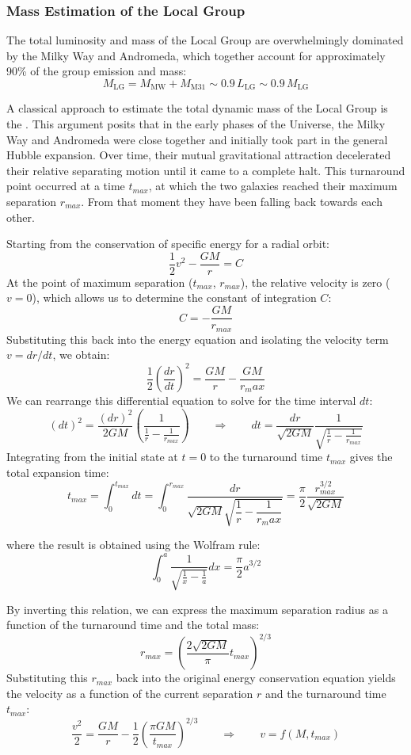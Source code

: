 \subsubsection{Mass Estimation of the Local Group}

The total luminosity and mass of the Local Group are overwhelmingly dominated by the Milky Way and Andromeda, which together account for approximately 90\% of the group emission and mass:
$$
M_{\mathrm{LG}} = M_{\mathrm{MW}} + M_{\mathrm{M31}} \sim 0.9\,L_{\mathrm{LG}} \sim 0.9\,M_{\mathrm{LG}}
$$

A classical approach to estimate the total dynamic mass of the Local Group is the . This argument posits that in the early phases of the Universe, the Milky Way and Andromeda were close together and initially took part in the general Hubble expansion. Over time, their mutual gravitational attraction decelerated their relative separating motion until it came to a complete halt. This turnaround point occurred at a time $t_{max}$, at which the two galaxies reached their maximum separation $r_{max}$. From that moment they have been falling back towards each other.

Starting from the conservation of specific energy for a radial orbit:
$$
\frac{1}{2} v^2 - \frac{G M}{r} = C
$$
At the point of maximum separation ($t_{max}$, $r_{max}$), the relative velocity is zero ($v = 0$), which allows us to determine the constant of integration $C$:
$$
C = - \frac{G M}{r_{max}}
$$
Substituting this back into the energy equation and isolating the velocity term $v = dr/dt$, we obtain:
$$
\dfrac 12 \left( \dfrac{dr}{dt} \right)^2 = \dfrac {G M}{r} - \dfrac{G M}{r_max}
$$
We can rearrange this differential equation to solve for the time interval $dt$:
$$
(dt)^2 = \frac{(dr)^2}{2 GM} \left( \frac{1}{\frac{1}{r} - \frac{1}{r_{max}}} \right) \qquad \Rightarrow \qquad dt = \frac{dr}{\sqrt{2 GM}} \frac{1}{\sqrt{\frac{1}{r} - \frac{1}{r_{max}}}}
$$
Integrating from the initial state at $t=0$ to the turnaround time $t_{max}$ gives the total expansion time:
$$
t_{max} = \int_0^{t_{max}} dt = \int_0^{r_{max}} \dfrac{dr}{\sqrt{2 GM} \sqrt{\dfrac{1}{r} - \dfrac{1}{r_max}}} = \dfrac {\pi}{2} \dfrac{r_{max}^{3/2}}{\sqrt{2 GM}}
$$

where the result is obtained using the Wolfram rule:
$$
\int_0^a \dfrac 1{\sqrt{\frac 1x - \frac 1a}} dx = \dfrac {\pi}{2} a^{3/2}
$$

By inverting this relation, we can express the maximum separation radius as a function of the turnaround time and the total mass:
$$
r_{max} = \left( \dfrac{2 \sqrt{2 G M}}{\pi} t_{max} \right)^{2/3}
$$
Substituting this $r_{max}$ back into the original energy conservation equation yields the velocity as a function of the current separation $r$ and the turnaround time $t_{max}$:
$$
\dfrac {v^2}2 = \dfrac {G M}{r} - \dfrac 12 \left( \dfrac{ \pi GM}{t_{max}} \right)^{2/3} \qquad \Rightarrow \qquad v = f(M, t_{max})
$$

